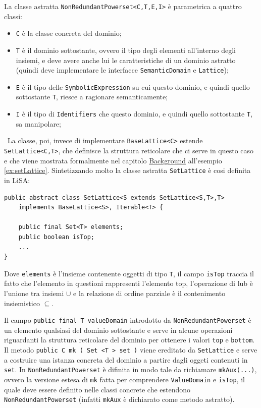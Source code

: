 La classe astratta \texttt{NonRedundantPowerset<C,T,E,I>} è parametrica a quattro classi:
\begin{itemize}
    \itemsep0pt
    \item \texttt{C} è la classe concreta del dominio;
    \item \texttt{T} è il dominio sottostante, ovvero il tipo degli elementi all'interno degli insiemi, e deve avere anche lui le caratteristiche di un dominio astratto (quindi deve implementare le interfacce \texttt{SemanticDomain} e \texttt{Lattice});
    \item \texttt{E} è il tipo delle \texttt{SymbolicExpression} su cui questo dominio, e quindi quello sottostante \texttt{T}, riesce a ragionare semanticamente;
    \item \texttt{I} è il tipo di \texttt{Identifiers} che questo dominio,  e quindi quello sottostante \texttt{T}, sa manipolare;
\end{itemize}\ 
La classe, poi, invece di implementare \texttt{BaseLattice<C>} estende \texttt{SetLattice<C,T>}, che definisce la struttura reticolare che ci serve in questo caso e che viene mostrata formalmente nel capitolo \hyperref[chapter:background]{Background} all'esempio \ref{ex:setLattice}. Sintetizzando molto la classe astratta \texttt{SetLattice} è cosi definita in LiSA:
\begin{lstlisting}[belowskip=-1.1 \baselineskip]
public abstract class SetLattice<S extends SetLattice<S,T>,T> 
    implements BaseLattice<S>, Iterable<T> {

    public final Set<T> elements;
    public boolean isTop;
    ...
}
\end{lstlisting}
Dove \texttt{elements} è l'insieme contenente oggetti di tipo \texttt{T}, il campo \texttt{isTop} traccia il fatto che l'elemento in questioni rappresenti l'elemento top, l'operazione di lub è l'unione tra insiemi \(\cup\) e la relazione di ordine parziale è il contenimento insiemistico \(\subseteq\).

Il campo \texttt{public final T valueDomain} introdotto da \texttt{NonRedundantPowerset} è un elemento qualsiasi del dominio sottostante e serve in alcune operazioni riguardanti la struttura reticolare del dominio per ottenere i valori \texttt{top} e \texttt{bottom}. Il metodo \texttt{public C mk ( Set <T > set )} viene ereditato da \texttt{SetLattice} e serve a costruire una istanza concreta del dominio a partire dagli oggeti contenuti in \texttt{set}. In \texttt{NonRedundantPowerset} è difinita in modo tale da richiamare \texttt{mkAux(...)}, ovvero la versione estesa di \texttt{mk} fatta per comprendere \texttt{ValueDomain} e \texttt{isTop}, il quale deve essere definito nelle classi concrete che estendono \texttt{NonRedundantPowerset} (infatti \texttt{mkAux} è dichiarato come metodo astratto).

